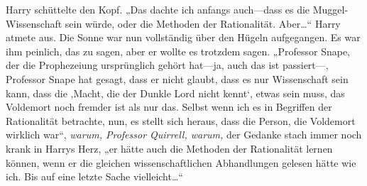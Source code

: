Harry schüttelte den Kopf.
„Das dachte ich anfangs auch—dass es die Muggel-Wissenschaft sein würde, oder die Methoden der Rationalität. Aber…“
Harry atmete aus. Die Sonne war nun vollständig über den Hügeln aufgegangen. Es war ihm peinlich, das zu sagen, aber er wollte es trotzdem sagen.
„Professor Snape, der die Prophezeiung ursprünglich gehört hat—ja, auch das ist passiert—, Professor Snape hat gesagt, dass er nicht glaubt, dass es nur Wissenschaft sein kann, dass die ‚Macht, die der Dunkle Lord nicht kennt‘, etwas sein muss, das Voldemort noch fremder ist als nur das. Selbst wenn ich es in Begriffen der Rationalität betrachte, nun, es stellt sich heraus, dass die Person, die Voldemort wirklich war“,
\emph{warum, Professor Quirrell, warum,} der Gedanke stach immer noch krank in Harrys Herz,
„er hätte auch die Methoden der Rationalität lernen können, wenn er die gleichen wissenschaftlichen Abhandlungen gelesen hätte wie ich. Bis auf eine letzte Sache vielleicht…“

